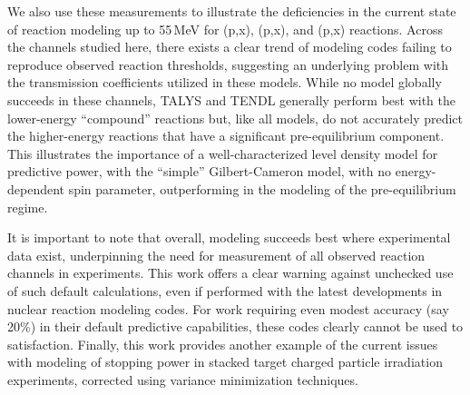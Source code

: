 We also use these measurements to illustrate the deficiencies in the current state of  reaction modeling up to 55\,MeV for  (p,x), (p,x), and  (p,x) reactions.
Across the channels studied here, there exists a clear trend of modeling codes failing to reproduce observed reaction thresholds, suggesting an underlying problem with the transmission coefficients utilized in these models.
While no model globally succeeds in these channels,   TALYS and TENDL generally perform best with the lower-energy \enquote{compound} reactions but, like all models, do not accurately predict the higher-energy reactions that have a significant pre-equilibrium component.
This illustrates the importance of a well-characterized level density model for predictive power, with the \enquote{simple} Gilbert-Cameron model, with no energy-dependent spin parameter,  outperforming in the modeling of the pre-equilibrium regime.


It is important to note that overall, modeling succeeds best where experimental data exist, underpinning the need for measurement of all observed reaction channels in experiments.
This work offers a clear warning against unchecked use of  such default calculations, even if performed with the latest developments in nuclear reaction modeling codes. 
For work requiring even modest accuracy (say 20\%) in their default predictive capabilities, these codes clearly cannot be used to satisfaction.   
Finally, this work provides another example of the current issues with modeling of  stopping power in stacked target charged particle irradiation experiments, corrected using variance minimization techniques.  
% 
% 





